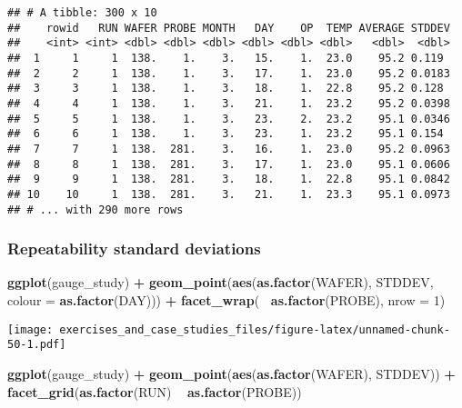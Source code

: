 \documentclass[]{book}
\newenvironment{Shaded}{\begin{snugshade}}{\end{snugshade}}
\newcommand{\DataTypeTok}[1]{\textcolor[rgb]{0.13,0.29,0.53}{#1}}
\newcommand{\DecValTok}[1]{\textcolor[rgb]{0.00,0.00,0.81}{#1}}
\newcommand{\KeywordTok}[1]{\textcolor[rgb]{0.13,0.29,0.53}{\textbf{#1}}}
\newcommand{\NormalTok}[1]{#1}
\newcommand{\OperatorTok}[1]{\textcolor[rgb]{0.81,0.36,0.00}{\textbf{#1}}}
\newcommand{\StringTok}[1]{\textcolor[rgb]{0.31,0.60,0.02}{#1}}
\theoremstyle{definition}
\theoremstyle{definition}
\theoremstyle{definition}
\theoremstyle{remark}
\begin{document}
\begin{verbatim}
## # A tibble: 300 x 10
##    rowid   RUN WAFER PROBE MONTH   DAY    OP  TEMP AVERAGE STDDEV
##    <int> <int> <dbl> <dbl> <dbl> <dbl> <dbl> <dbl>   <dbl>  <dbl>
##  1     1     1  138.    1.    3.   15.    1.  23.0    95.2 0.119 
##  2     2     1  138.    1.    3.   17.    1.  23.0    95.2 0.0183
##  3     3     1  138.    1.    3.   18.    1.  22.8    95.2 0.128 
##  4     4     1  138.    1.    3.   21.    1.  23.2    95.2 0.0398
##  5     5     1  138.    1.    3.   23.    2.  23.2    95.1 0.0346
##  6     6     1  138.    1.    3.   23.    1.  23.2    95.1 0.154 
##  7     7     1  138.  281.    3.   16.    1.  23.0    95.2 0.0963
##  8     8     1  138.  281.    3.   17.    1.  23.0    95.1 0.0606
##  9     9     1  138.  281.    3.   18.    1.  22.8    95.1 0.0842
## 10    10     1  138.  281.    3.   21.    1.  23.3    95.1 0.0973
## # ... with 290 more rows
\end{verbatim}

\hypertarget{repeatability-standard-deviations}{%
\subsubsection{Repeatability standard
deviations}\label{repeatability-standard-deviations}}

\begin{Shaded}
\begin{Highlighting}[]
\KeywordTok{ggplot}\NormalTok{(gauge_study) }\OperatorTok{+}
\StringTok{  }\KeywordTok{geom_point}\NormalTok{(}\KeywordTok{aes}\NormalTok{(}\KeywordTok{as.factor}\NormalTok{(WAFER), STDDEV, }\DataTypeTok{colour =} \KeywordTok{as.factor}\NormalTok{(DAY))) }\OperatorTok{+}
\StringTok{  }\KeywordTok{facet_wrap}\NormalTok{(}\OperatorTok{~}\StringTok{ }\KeywordTok{as.factor}\NormalTok{(PROBE), }\DataTypeTok{nrow =} \DecValTok{1}\NormalTok{)}
\end{Highlighting}
\end{Shaded}

\texttt{[image: exercises\_and\_case\_studies\_files/figure-latex/unnamed-chunk-50-1.pdf]}

\begin{Shaded}
\begin{Highlighting}[]
\KeywordTok{ggplot}\NormalTok{(gauge_study) }\OperatorTok{+}
\StringTok{  }\KeywordTok{geom_point}\NormalTok{(}\KeywordTok{aes}\NormalTok{(}\KeywordTok{as.factor}\NormalTok{(WAFER), STDDEV)) }\OperatorTok{+}
\StringTok{  }\KeywordTok{facet_grid}\NormalTok{(}\KeywordTok{as.factor}\NormalTok{(RUN) }\OperatorTok{~}\StringTok{ }\KeywordTok{as.factor}\NormalTok{(PROBE))}
\end{Highlighting}
\end{Shaded}
\end{document}
